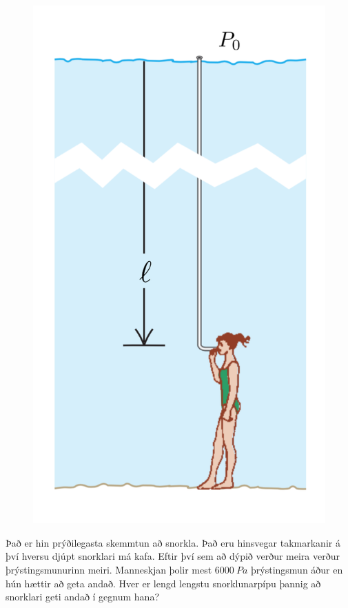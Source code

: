 \begin{enumerate}[label = \textbf{Dæmi \thechapter.\arabic*.}]
\begin{minipage}{\linewidth}
\begin{figure}
\vspace{-0.75cm}
\includegraphics[scale = 0.245]{images/kafa2.png}
\end{figure}

\item Það er hin prýðilegasta skemmtun að snorkla. Það eru hinsvegar takmarkanir á því hversu djúpt snorklari má kafa. Eftir því sem að dýpið verður meira verður þrýstingsmunurinn meiri. Manneskjan þolir mest $\SI{6000}{Pa}$ þrýstingsmun áður en hún hættir að geta andað. Hver er lengd lengstu snorklunarpípu þannig að snorklari geti andað í gegnum hana?


\end{minipage}
\end{enumerate}
